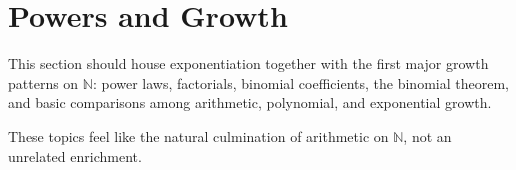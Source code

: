 \section{Powers and Growth}

This section should house exponentiation together with the first major growth
patterns on $\mathbb{N}$: power laws, factorials, binomial coefficients, the
binomial theorem, and basic comparisons among arithmetic, polynomial, and
exponential growth.

\begin{remark}
These topics feel like the natural culmination of arithmetic on $\mathbb{N}$,
not an unrelated enrichment.
\end{remark}
